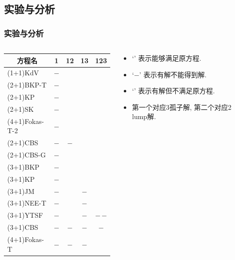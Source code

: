 \documentclass{beamer}
\newcommand{\tpa}{\checkmark}
\newcommand{\tpb}{$-$}
\newcommand{\tpc}{\texttimes}
\begin{document}
\subsection{实验与分析}
\begin{frame}
\frametitle{实验与分析}
\begin{columns}
\begin{column}{0.65\textwidth}
\begin{table}
\centering
\small 
\begin{tabular}{lcccc}
\hline
\multicolumn{1}{c}{方程名} & 1 & 12 & 13 & 123 \\ 
\hline
(1+1)KdV & \tpa\tpb & & & \\
(2+1)BKP-T & \tpa\tpb & \tpa\tpa & & \\
(2+1)KP &\tpa\tpb &\tpa\tpa & & \\
(2+1)SK &\tpa\tpb &\tpa\tpa & & \\
(4+1)Fokas-T-2 &\tpa\tpb &\tpa\tpa & & \\
(2+1)CBS & \tpa\tpb & \tpa\tpb & & \\
(2+1)CBS-G & \tpa\tpb & \tpc\tpc & & \\
(3+1)BKP &\tpa\tpb &\tpa\tpa &\tpa\tpa &\tpc\tpc \\
(3+1)KP &\tpa\tpb &\tpa\tpa &\tpa\tpa &\tpc\tpc \\
(3+1)JM &\tpa\tpb &\tpa\tpa &\tpa\tpb &\tpc\tpc \\
(3+1)NEE-T &\tpa\tpb &\tpa\tpa &\tpa\tpb &\tpc\tpc \\
(3+1)YTSF &\tpa\tpb &\tpa\tpa &\tpa\tpb &\tpb\,\tpb \\
(3+1)CBS &\tpa\tpb &\tpa\tpb &\tpa\tpb &\tpa\tpb \\
(4+1)Fokas-T &\tpa\tpb &\tpa\tpb &\tpa\tpb &\tpc\tpc \\
\hline
\end{tabular}
\end{table}
\end{column}
\begin{column}{0.35\textwidth}
\begin{itemize}
\item `\tpa{}' 表示能够满足原方程.
\item `\tpb{}' 表示有解不能得到解.
\item `\tpc{}' 表示有解但不满足原方程.
\item 第一个对应3孤子解, 第二个对应2 lump解.
\end{itemize}
\end{column}
\end{columns}
\end{frame}
\end{document}
